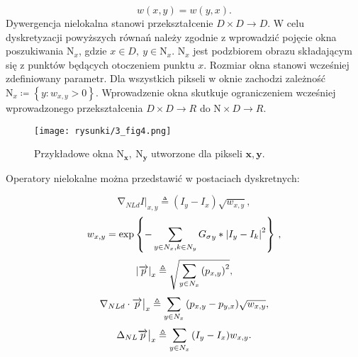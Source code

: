 \documentclass[a4paper,12pt,twoside,openany]{report}
\begin{document}
\begin{equation}
w(x,y) = w(y,x)
\label{SMARTWEIGHT}
.
\end{equation}
Dywergencja nielokalna stanowi przekształcenie $D \times D \longrightarrow D$.
W celu dyskretyzacji powyższych równań należy zgodnie z \cite{gilboa2008nonlocal} wprowadzić pojęcie okna poszukiwania ${\mathrm{N}}_x$, gdzie $x\in D,\ y\in {\mathrm{N}}_x$. ${\mathrm{N}}_x$ jest podzbiorem obrazu składającym się z punktów będących otoczeniem punktu $x$. Rozmiar okna stanowi wcześniej zdefiniowany parametr. Dla wszystkich pikseli w oknie zachodzi zależność ${\mathrm{N}}_x\coloneqq \left\{y:w_{x,y}>0\right\}$. Wprowadzenie okna skutkuje ograniczeniem wcześniej wprowadzonego przekształcenia $D \times D\longrightarrow R$ do $\mathrm{N} \times D\longrightarrow R$.
\begin{figure}[!h]
	\centering
	\texttt{[image: rysunki/3\_fig4.png]}
	\caption{Przykładowe okna ${\boldsymbol{\mathrm{N}}}_{\boldsymbol{x}}\boldsymbol{,\ }{\boldsymbol{\mathrm{N}}}_{\boldsymbol{y}}$ utworzone dla pikseli $\boldsymbol{x},\boldsymbol{y}$.}
	\label{3_fig4}
\end{figure}
Operatory nielokalne można przedstawić w postaciach dyskretnych:
\begin{large}
\begin{equation}
{\mathrm{\nabla }}_{NLd}I|_{x,y}\triangleq \left(I_y-I_x\right)\sqrt{w_{x,y}}
\label{DNLGRAD}
,
\end{equation}
\begin{equation}
w_{x,y}={\mathrm{exp} \left\{-\sum_{y\in N_x,k\in N_y \\
}{{G_{\sigma}}_y \ast {\left|I_y-I_k\right|}^2}\right\}\ }
\label{DNLWEIGHT}
,
\end{equation}
\begin{equation}
{\left|\overrightarrow{p}\right|}_x\triangleq \sqrt{\sum_{y\in N_x \\ 
}{{\left(p_{x,y}\right)}^2}}
\label{DNLMAG}
,
\end{equation}
\begin{equation}
{\mathrm{\nabla }}_{NLd}\cdot \overrightarrow{p}\big|_x \triangleq \sum_{ 
y\in N_x \\ 
}{\left(p_{x,y}-p_{y,x}\right)}\sqrt{w_{x,y}}
\label{DNLDIV}
,
\end{equation}
\begin{equation}
{\mathrm{\Delta }}_{NL}{\overrightarrow{p}}\big|_x \triangleq \sum_{
y\in N_x \\ 
}{\left(I_y-I_x\right)}w_{x,y}
\label{DNLLAP}
.
\end{equation}
\end{large}
\end{document}
